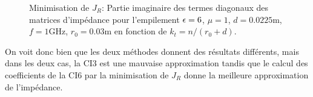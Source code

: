   \begin{figure}[!hbt]
    \centering
    
    \caption[CIOE sur empilement de Hoppe & Rahmat-Samii p.~62]{Minimisation de \(J_R\): Partie imaginaire des termes diagonaux des matrices d'impédance pour l'empilement \(\epsilon = 6\), \(\mu = 1\), \(d=0.0225\text{m}\), \(f=1\text{GHz}\), \(r_0=0.03\text{m}\) en fonction de \(k_t = n / (r_0+d)\).}
    \label{fig:imp_fourier:cylindre:hoppe:62:hoibc:mode_1}
  \end{figure}
  On voit donc bien que les deux méthodes donnent des résultats différents, mais dans les deux cas, la CI3 est une mauvaise approximation tandis que le calcul des coefficients de la CI6 par la minimisation de \(J_R\) donne la meilleure approximation de l'impédance.

